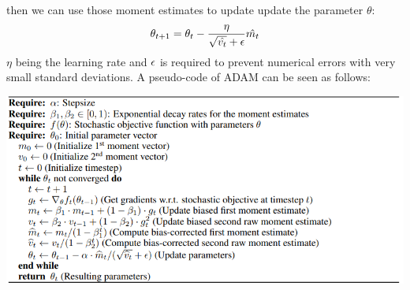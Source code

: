\documentclass[10pt,a4paper]{article}
\begin{document}
then we can use those moment estimates to update update the parameter $\theta$:
\begin{align*}
    \theta_{t+1}=\theta_t - \frac{\eta}{\sqrt{\hat{v_t}}+{\epsilon}}\hat{m_t}
\end{align*}
$\eta$ being the learning rate and ${\epsilon}$ is required to prevent numerical errors with very small standard deviations.
A pseudo-code of ADAM can be seen as follows:\\
\begin{center}
 \includegraphics[scale=0.4]{pseudocode.png}
\end{center}
\end{document}
